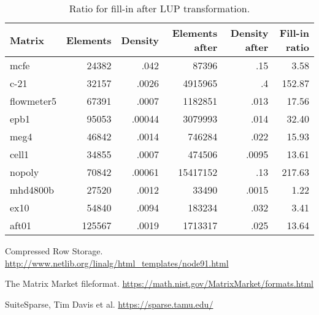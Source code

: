 \documentclass[10pt,a4paper]{article}
\begin{document}
\begin{table}
\begin{tabular}{|l|rr|rr|r|}
\hline 
Matrix & Elements & Density & Elements after & Density after & Fill-in ratio\\ 
\hline 
mcfe & 24382 & .042  & 87396 & .15 & 3.58  \\
c-21 &  32157 & .0026  & 4915965 & .4 & 152.87  \\ 
flowmeter5 & 67391 & .0007 & 1182851 & .013 & 17.56 \\ 
epb1 & 95053  & .00044  & 3079993 & .014 & 32.40 \\ 
meg4 & 46842 & .0014 & 746284 & .022 & 15.93 \\ 
cell1 & 34855  & .0007  & 474506  & .0095 & 13.61 \\ 
nopoly &  70842 & .00061  & 15417152 & .13 & 217.63 \\ 
mhd4800b & 27520  &  .0012 & 33490  & .0015 & 1.22\\ 
ex10 & 54840 &  .0094 & 183234 & .032 & 3.41\\ 
aft01 & 125567  & .0019  & 1713317 & .025 & 13.64\\ 
\hline 
\end{tabular} 
\label{fillin}
\caption{Ratio for fill-in after LUP transformation.}
\end{table}



\begin{thebibliography}{XX}

Compressed Row Storage. \url{http://www.netlib.org/linalg/html_templates/node91.html}

The Matrix Market fileformat. \url{https://math.nist.gov/MatrixMarket/formats.html} 

SuiteSparse, Tim Davis et al. \url{https://sparse.tamu.edu/}

\end{thebibliography}
\end{document}
